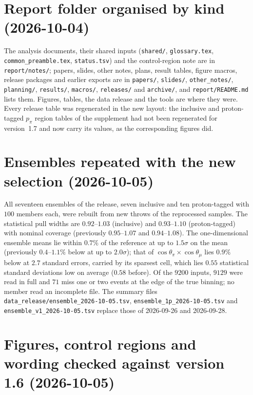 \section{Report folder organised by kind (2026-10-04)}

The analysis documents, their shared inputs (\texttt{shared/}, \texttt{glossary.tex}, \texttt{common\_preamble.tex},
\texttt{status.tsv}) and the control-region note are in \texttt{report/notes/}; papers, slides, other notes, plans,
result tables, figure macros, release packages and earlier exports are in \texttt{papers/}, \texttt{slides/},
\texttt{other\_notes/}, \texttt{planning/}, \texttt{results/}, \texttt{macros/}, \texttt{releases/} and \texttt{archive/}, and
\texttt{report/README.md} lists them. Figures, tables, the data release and the tools are where they were. Every
release table was regenerated in the new layout: the inclusive and proton-tagged $p_\pi$ region tables of the
supplement had not been regenerated for version~1.7 and now carry its values, as the corresponding figures did.

\section{Ensembles repeated with the new selection (2026-10-05)}

All seventeen ensembles of the release, seven inclusive and ten proton-tagged with $100$ members each, were rebuilt
from new throws of the reprocessed samples. The statistical pull widths are $0.92$--$1.03$ (inclusive) and
$0.93$--$1.10$ (proton-tagged) with nominal coverage (previously $0.95$--$1.07$ and $0.94$--$1.08$). The
one-dimensional ensemble means lie within $0.7\%$ of the reference at up to $1.5\sigma$ on the mean (previously
$0.4$--$1.1\%$ below at up to $2.0\sigma$); that of $\cos\theta_\pi\times\cos\theta_\mu$ lies $0.9\%$ below at $2.7$
standard errors, carried by its sparsest cell, which lies $0.55$ statistical standard deviations low on average
($0.58$ before). Of the $9200$ inputs, $9129$ were read in full and $71$ miss one or two events at the edge of the
true binning; no member read an incomplete file. The summary files \texttt{data\_release/ensemble\_2026-10-05.tsv},
\texttt{ensemble\_1p\_2026-10-05.tsv} and \texttt{ensemble\_v1\_2026-10-05.tsv} replace those of 2026-09-26 and
2026-09-28.

\section{Figures, control regions and wording checked against version 1.6 (2026-10-05)}

